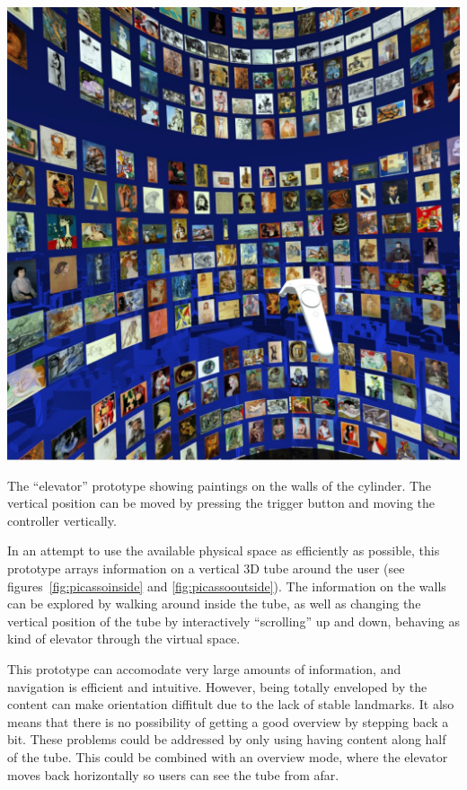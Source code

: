 \documentclass{tufte-book} %
\begin{document}
\begin{marginfigure}
  \includegraphics[width=\linewidth]{picassoinside.jpg}
  \caption{The ``elevator'' prototype showing paintings on the walls of the cylinder. The vertical position can be moved by pressing the trigger button and moving the controller vertically.}
  \label{fig:picassoinside}
\end{marginfigure}

In an attempt to use the available physical space as efficiently as possible, this prototype arrays information on a vertical 3D tube around the user (see figures~\ref{fig:picassoinside} and \ref{fig:picassooutside}). The information on the walls can be explored by walking around inside the tube, as well as changing the vertical position of the tube by interactively ``scrolling'' up and down, behaving as kind of elevator through the virtual space.

This prototype can accomodate very large amounts of information, and navigation is efficient and intuitive. However, being totally enveloped by the content can make orientation diffitult due to the lack of stable landmarks. It also means that there is no possibility of getting a good overview by stepping back a bit. These problems could be addressed by only using having content along half of the tube. This could be combined with an overview mode, where the elevator moves back horizontally so users can see the tube from afar.
\end{document}
